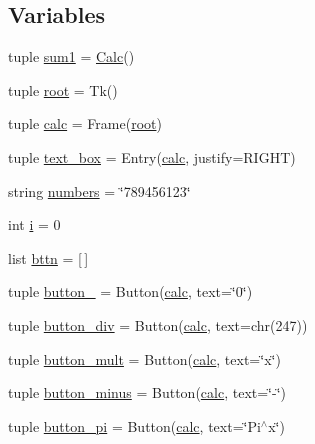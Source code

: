 \subsection*{Variables}
\begin{DoxyCompactItemize}
\item 
tuple \hyperlink{namespaceprometheus_aec2e562eda837929fe629d770049b013}{sum1} = \hyperlink{classprometheus_1_1_calc}{Calc}()
\item 
tuple \hyperlink{namespaceprometheus_af456f25d903de5f1f4ef75aa169e633e}{root} = Tk()
\item 
tuple \hyperlink{namespaceprometheus_a60a6abd0df8dd40511ee475a11809000}{calc} = Frame(\hyperlink{namespaceprometheus_af456f25d903de5f1f4ef75aa169e633e}{root})
\item 
tuple \hyperlink{namespaceprometheus_a2718e8e275fdc2802484c9463a16bbe1}{text\+\_\+box} = Entry(\hyperlink{namespaceprometheus_a60a6abd0df8dd40511ee475a11809000}{calc}, justify=R\+I\+G\+H\+T)
\item 
string \hyperlink{namespaceprometheus_a43e504a5075c03d626d686a16fc5b9fd}{numbers} = \char`\"{}789456123\char`\"{}
\item 
int \hyperlink{namespaceprometheus_ac49d1c0c7650d23290b39f53f92d9ab9}{i} = 0
\item 
list \hyperlink{namespaceprometheus_ae96706ffa40071dc05df25e8bd0ea74c}{bttn} = \mbox{[}$\,$\mbox{]}
\item 
tuple \hyperlink{namespaceprometheus_a8ec883ed258c43b62014cd4649ebb22e}{button\+\_} = Button(\hyperlink{namespaceprometheus_a60a6abd0df8dd40511ee475a11809000}{calc}, text=\char`\"{}0\char`\"{})
\item 
tuple \hyperlink{namespaceprometheus_a26264791ad833e98a27771358dc75545}{button\+\_\+div} = Button(\hyperlink{namespaceprometheus_a60a6abd0df8dd40511ee475a11809000}{calc}, text=chr(247))
\item 
tuple \hyperlink{namespaceprometheus_a368f4f2e75a79265c320c2d2fbf4a88d}{button\+\_\+mult} = Button(\hyperlink{namespaceprometheus_a60a6abd0df8dd40511ee475a11809000}{calc}, text=\char`\"{}x\char`\"{})
\item 
tuple \hyperlink{namespaceprometheus_aaaa3372c631536f4910461741c9e9391}{button\+\_\+minus} = Button(\hyperlink{namespaceprometheus_a60a6abd0df8dd40511ee475a11809000}{calc}, text=\char`\"{}-\/\char`\"{})
\item 
tuple \hyperlink{namespaceprometheus_a587dbc081c01855657055a2ae3e99fab}{button\+\_\+pi} = Button(\hyperlink{namespaceprometheus_a60a6abd0df8dd40511ee475a11809000}{calc}, text=\char`\"{}Pi$^\wedge$x\char`\"{})

\end{DoxyCompactItemize}
